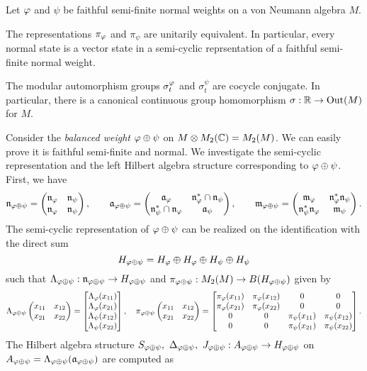 \documentclass{../../../small}
\begin{document}
\begin{thm}
Let $\f$ and $\psi$ be faithful semi-finite normal weights on a von Neumann algebra $M$.
\begin{parts}
\item The representations $\pi_\f$ and $\pi_\psi$ are unitarily equivalent.
In particular, every normal state is a vector state in a semi-cyclic reprsentation of a faithful semi-finite normal weight.
\item The modular automorphism groups $\sigma_t^\f$ and $\sigma_t^\psi$ are cocycle conjugate.
In particular, there is a canonical continuous group homomorphism $\sigma:\R\to\operatorname{Out}(M)$ for $M$.
\end{parts}
\end{thm}
\begin{pf}
Consider the \emph{balanced weight} $\f\oplus\psi$ on $M\otimes M_2(\C)=M_2(M)$.
We can easily prove it is faithful semi-finite and normal.
We investigate the semi-cyclic representation and the left Hilbert algebra structure corresponding to $\f\oplus\psi$.
First, we have
\[\fn_{\f\oplus\psi}=\mat{\fn_\f&\fn_\psi\\\fn_\f&\fn_\psi},\qquad
\fa_{\f\oplus\psi}=\mat{\fa_\f&\fn_\f^*\cap\fn_\psi\\\fn_\psi^*\cap\fn_\f&\fa_\psi},\qquad
\fm_{\f\oplus\psi}=\mat{\fm_\f&\fn_\f^*\fn_\psi\\\fn_\psi^*\fn_\f&\fm_\psi}.
\]
The semi-cyclic representation of $\f\oplus\psi$ can be realized on the identification with the direct sum
\[H_{\f\oplus\psi}=H_\f\oplus H_\f\oplus H_\psi\oplus H_\psi\]
such that $\Lambda_{\f\oplus\psi}:\fn_{\f\oplus\psi}\to H_{\f\oplus\psi}$ and $\pi_{\f\oplus\psi}:M_2(M)\to B(H_{\f\oplus\psi})$ given by
\[\Lambda_{\f\oplus\psi}\mat{x_{11}&x_{12}\\x_{21}&x_{22}}=\mat[b]{\Lambda_\f(x_{11})\\\Lambda_\f(x_{21})\\\Lambda_\psi(x_{12})\\\Lambda_\psi(x_{22})},\quad
\pi_{\f\oplus\psi}\mat{x_{11}&x_{12}\\x_{21}&x_{22}}=\mat[b]{
\pi_\f(x_{11})&\pi_\f(x_{12})&0&0\\
\pi_\f(x_{21})&\pi_\f(x_{22})&0&0\\
0&0&\pi_\psi(x_{11})&\pi_\psi(x_{12})\\
0&0&\pi_\psi(x_{21})&\pi_\psi(x_{22})}.\]
The Hilbert algebra structure $S_{\f\oplus\psi},\ \Delta_{\f\oplus\psi},\ J_{\f\oplus\psi}:A_{\f\oplus\psi}\to H_{\f\oplus\psi}$ on $A_{\f\oplus\psi}=\Lambda_{\f\oplus\psi}(\fa_{\f\oplus\psi})$ are computed as

\end{pf}
\end{document}
